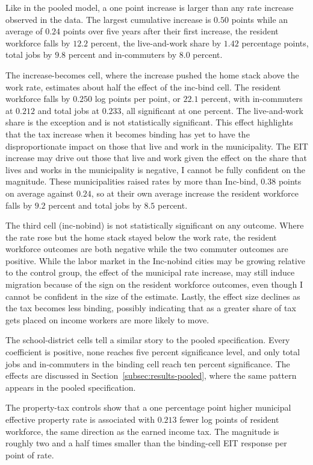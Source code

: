 \documentclass[12pt]{article}
\begin{document}
Like in the pooled model, a one point increase is larger than any rate increase observed in the data. The largest cumulative increase is $0.50$ points while an average of $0.24$ points over
five years after their first increase, the resident workforce falls by $12.2$
percent, the live-and-work share by $1.42$ percentage points, total jobs
by $9.8$ percent and in-commuters by $8.0$ percent.

The increase-becomes cell, where the increase pushed the home
stack above the work rate, estimates about half the effect of the inc-bind cell. The resident
workforce falls by $0.250$ log points per point, or $22.1$ percent, with
in-commuters at $0.212$ and total jobs at $0.233$, all significant at one
percent. The live-and-work share is the exception and is not statistically significant. This effect highlights that the tax increase when it becomes binding has yet to have the disproportionate impact on those that live and work in the municipality. The EIT increase may drive out those that live and work given the effect on the share that lives and works in the municipality is negative, I cannot be fully confident on the magnitude. 
These municipalities raised rates by more than
Inc-bind, $0.38$ points on average against $0.24$, so at their
own average increase the resident workforce falls by $9.2$ percent and
total jobs by $8.5$ percent. 

The third cell (inc-nobind) is not statistically significant on any outcome. Where the rate rose but the home stack stayed below
the work rate, the resident workforce outcomes are both negative while the two
commuter outcomes are positive. While the labor market in the Inc-nobind cities may be growing relative to the control group, the effect of the municipal rate increase, may still induce migration because of the sign on the resident workforce outcomes, even though I cannot be confident in the size of the estimate. Lastly, the effect size declines as the tax becomes less binding, possibly indicating that as a greater share of tax gets placed on income workers are more likely to move.

The school-district cells tell a similar story to the pooled specification. Every coefficient is positive, none
reaches five percent significance level, and only total jobs and in-commuters in the binding
cell reach ten percent significance. The effects are discussed in Section~\ref{subsec:results-pooled}, where
the same pattern appears in the pooled specification.

The property-tax controls show that a one percentage point
higher municipal effective property rate is associated with $0.213$ fewer
log points of resident workforce, the same direction as the earned income
tax. The magnitude is roughly two and a half
times smaller than the binding-cell EIT response per point of rate.
\end{document}
